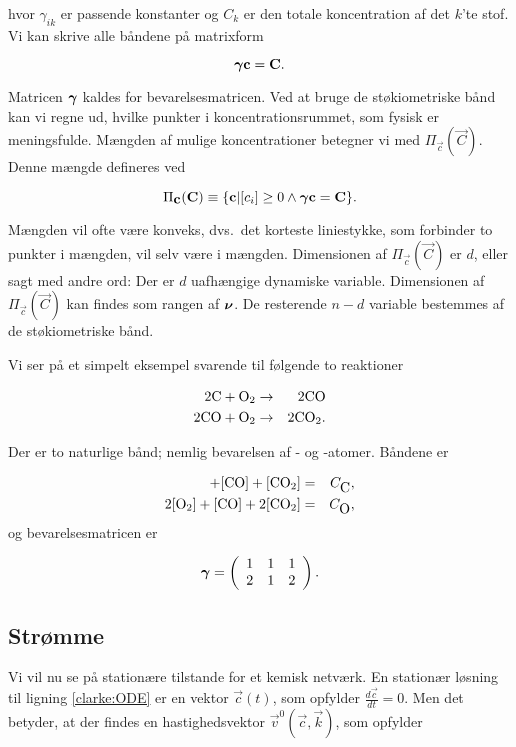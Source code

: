 hvor $\gamma_{ik}$ er passende konstanter og $C_k$ er den
totale koncentration af det $k$'te stof. Vi
kan skrive alle b{\aa}ndene p{\aa} matrixform

\[
  \mbox{\boldmath $\gamma$}\mbox{${\bf c}$} = \mbox{${\bf C}$}.
\]

Matricen $\mbox{\boldmath $\gamma$}$ kaldes for bevarelsesmatricen.
Ved at bruge de st{\o}kiometriske b{\aa}nd kan vi regne ud,
hvilke punkter i koncentrationsrummet, som fysisk er
meningsfulde. M{\ae}ngden af mulige koncentrationer
betegner vi med $\Pi_{\vec{c}}(\vec{C})$. Denne m{\ae}ngde
defineres ved

\begin{equation}
\Pi_{\mbox{${\bf c}$}}(\mbox{${\bf C}$}) \equiv \{\mbox{${\bf c}$} | [c_i] \ge 0 \wedge
\mbox{\boldmath $\gamma$}\mbox{${\bf c}$} = \mbox{${\bf C}$}\}.
\end{equation}

M{\ae}ngden vil ofte v{\ae}re konveks, dvs.\ det korteste
liniestykke, som forbinder to punkter i m{\ae}ngden, vil
selv v{\ae}re i m{\ae}ngden. Dimensionen af
$\Pi_{\vec{c}}(\vec{C})$ er $d$, eller sagt med andre ord:
Der er $d$ uafh{\ae}ngige dynamiske variable. Dimensionen
af $\Pi_{\vec{c}}(\vec{C})$ kan findes som rangen af
$\mbox{\boldmath $\nu$}$. De resterende $n-d$ variable bestemmes af
de st{\o}kiometriske b{\aa}nd.

\vspace{4.0mm}
Vi ser p{\aa} et simpelt eksempel svarende til f{\o}lgende
to reaktioner

\begin{eqnarray*}
2 \mbox{$\rm C$} + \mbox{$\rm O_2$} &\rightarrow& 2 \mbox{$\rm CO$} \\ 
2 \mbox{$\rm CO$} + \mbox{$\rm O_2$} &\rightarrow& 2 \mbox{$\rm CO_2$}.
\end{eqnarray*}

Der er to naturlige b{\aa}nd; nemlig bevarelsen af
- og -atomer. B{\aa}ndene er

\begin{eqnarray*}
[{\chem{C}}] + [{\chem{CO}}] + [{\chem{CO_2}}] &=& C_{\chem{C}}, \\
2 [{\chem{O_2}}] + [{\chem{CO}}] + 2 [{\chem{CO_2}}] &=& C_{\chem{O}},
\end{eqnarray*}
og bevarelsesmatricen er

\[
\mbox{\boldmath $\gamma$} = \left(
\begin{array}{ccc}
1 & 1 & 1 \\
2 & 1 & 2 
\end{array}\right).
\]

\subsection{Str{\o}mme}
\label{clarke:EC}
Vi vil nu se p{\aa} station{\ae}re tilstande for et kemisk
netv{\ae}rk. En station{\ae}r l{\o}sning til ligning
\ref{clarke:ODE} er en vektor $\vec{c}(t)$, som opfylder
$\frac{d\vec{c}}{dt} = 0$. Men det betyder, at der findes
en hastighedsvektor $\vec{v}^0(\vec{c}, \vec{k})$, som
opfylder

